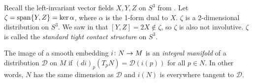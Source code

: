 \begin{example}\label{ex:S^3 standard contact structure}
	Recall the left-invariant vector fields $X,Y,Z$ on $S^3$ from . Let $\zeta = \operatorname{span} \{Y,Z\} = \ker \alpha$, where $\alpha$ is the 1-form dual to $X$. $\zeta$ is a 2-dimensional distribution on $S^3$. We saw in  that $[Y,Z] = 2X \notin \zeta$, so $\zeta$ is also not involutive. $\zeta$ is called the \emph{standard tight contact structure} on $S^3$.
\end{example}

\begin{definition}\label{def:integral manifold}
	The image of a smooth embedding $i \colon\thinspace\! N \to M$ is an \emph{integral manifold} of a distribution $\mathcal{D}$ on $M$ if $(di)_p\left(T_pN\right) = \mathcal{D}(i(p))$ for all $p \in N$. In other words, $N$ has the same dimension as $\mathcal{D}$ and $i(N)$ is everywhere tangent to $\mathcal{D}$.
\end{definition}

